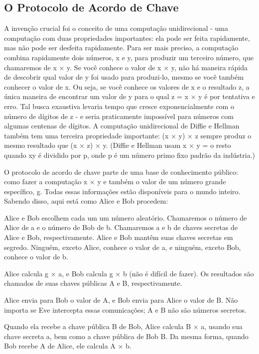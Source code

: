 \documentclass{book}
\begin{document}

\subsection{O Protocolo de Acordo de Chave}
\label{segredos:prot-acordo-chave}

A invenção crucial foi o conceito de uma computação unidirecional - uma computação com duas propriedades importantes: ela pode ser feita rapidamente, mas não pode ser desfeita rapidamente. Para ser mais preciso, a computação combina rapidamente dois números, x e y, para produzir um terceiro número, que chamaremos de x × y. Se você conhece o valor de x × y, não há maneira rápida de descobrir qual valor de y foi usado para produzi-lo, mesmo se você também conhecer o valor de x. Ou seja, se você conhece os valores de x e o resultado z, a única maneira de encontrar um valor de y para o qual z = x × y é por tentativa e erro. Tal busca exaustiva levaria tempo que cresce exponencialmente com o número de dígitos de z - e seria praticamente impossível para números com algumas centenas de dígitos. A computação unidirecional de Diffie e Hellman também tem uma terceira propriedade importante: (x × y) × z sempre produz o mesmo resultado que (x × z) × y. (Diffie e Hellman usam x × y = o resto quando xy é dividido por p, onde p é um número primo fixo padrão da indústria.)

O protocolo de acordo de chave parte de uma base de conhecimento público: como fazer a computação x × y e também o valor de um número grande específico, g. Todas essas informações estão disponíveis para o mundo inteiro. Sabendo disso, aqui está como Alice e Bob procedem:

Alice e Bob escolhem cada um um número aleatório. Chamaremos o número de Alice de a e o número de Bob de b. Chamaremos a e b de chaves secretas de Alice e Bob, respectivamente. Alice e Bob mantêm suas chaves secretas em segredo. Ninguém, exceto Alice, conhece o valor de a, e ninguém, exceto Bob, conhece o valor de b.

Alice calcula g × a, e Bob calcula g × b (não é difícil de fazer). Os resultados são chamados de suas chaves públicas A e B, respectivamente.

Alice envia para Bob o valor de A, e Bob envia para Alice o valor de B. Não importa se Eve intercepta essas comunicações; A e B não são números secretos.

Quando ela recebe a chave pública B de Bob, Alice calcula B × a, usando sua chave secreta a, bem como a chave pública de Bob B. Da mesma forma, quando Bob recebe A de Alice, ele calcula A × b.
\end{document}
